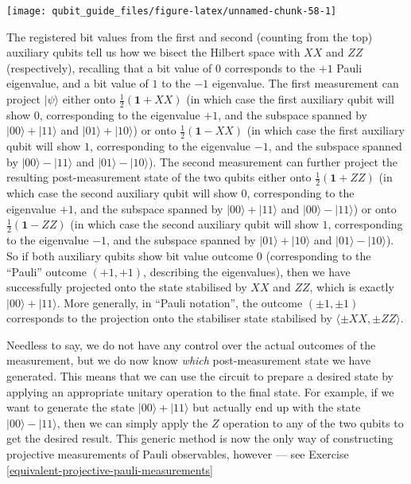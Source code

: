 \documentclass[fleqn,a4paper]{article}
\theoremstyle{definition}
\theoremstyle{definition}
\theoremstyle{definition}
\theoremstyle{definition}
\theoremstyle{remark}
\begin{document}
\begin{center}\texttt{[image: qubit\_guide\_files/figure-latex/unnamed-chunk-58-1]} \end{center}

The registered bit values from the first and second (counting from the top) auxiliary qubits tell us how we bisect the Hilbert space with \(XX\) and \(ZZ\) (respectively), recalling that a bit value of \(0\) corresponds to the \(+1\) Pauli eigenvalue, and a bit value of \(1\) to the \(-1\) eigenvalue.
The first measurement can project \(|\psi\rangle\) either onto \(\frac{1}{2}(\mathbf{1}+XX)\) (in which case the first auxiliary qubit will show \(0\), corresponding to the eigenvalue \(+1\), and the subspace spanned by \(|00\rangle+|11\rangle\) and \(|01\rangle+|10\rangle\)) or onto \(\frac{1}{2}(\mathbf{1}-XX)\) (in which case the first auxiliary qubit will show \(1\), corresponding to the eigenvalue \(-1\), and the subspace spanned by \(|00\rangle-|11\rangle\) and \(|01\rangle-|10\rangle\)).
The second measurement can further project the resulting post-measurement state of the two qubits either onto \(\frac{1}{2}(\mathbf{1}+ZZ)\) (in which case the second auxiliary qubit will show \(0\), corresponding to the eigenvalue \(+1\), and the subspace spanned by \(|00\rangle+|11\rangle\) and \(|00\rangle-|11\rangle\)) or onto \(\frac{1}{2}(\mathbf{1}-ZZ)\) (in which case the second auxiliary qubit will show \(1\), corresponding to the eigenvalue \(-1\), and the subspace spanned by \(|01\rangle+|10\rangle\) and \(|01\rangle-|10\rangle\)).
So if both auxiliary qubits show bit value outcome \(0\) (corresponding to the ``Pauli'' outcome \((+1,+1)\), describing the eigenvalues), then we have successfully projected onto the state stabilised by \(XX\) and \(ZZ\), which is exactly \(|00\rangle+|11\rangle\).
More generally, in ``Pauli notation'', the outcome \((\pm1,\pm1)\) corresponds to the projection onto the stabiliser state stabilised by \(\langle\pm XX,\pm ZZ\rangle\).

Needless to say, we do not have any control over the actual outcomes of the measurement, but we do now know \emph{which} post-measurement state we have generated.
This means that we can use the circuit to prepare a desired state by applying an appropriate unitary operation to the final state.
For example, if we want to generate the state \(|00\rangle+|11\rangle\) but actually end up with the state \(|00\rangle-|11\rangle\), then we can simply apply the \(Z\) operation to any of the two qubits to get the desired result.
This generic method is now the only way of constructing projective measurements of Pauli observables, however --- see Exercise \ref{equivalent-projective-pauli-measurements}
\end{document}
